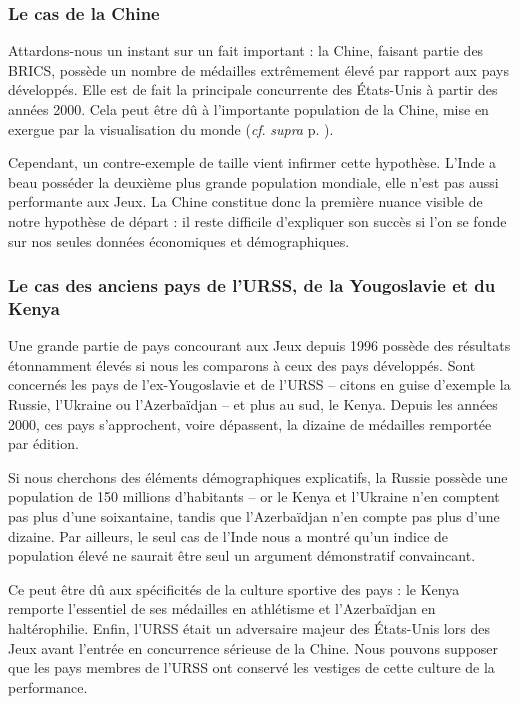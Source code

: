 \documentclass[hidelinks, 12pt]{report}
\begin{document}
\subsubsection{Le cas de la Chine}

Attardons-nous un instant sur un fait important : la Chine, faisant partie des BRICS, possède un nombre de médailles extrêmement élevé par rapport aux pays développés. Elle est de fait la principale concurrente des États-Unis à partir des années 2000. Cela peut être dû à l'importante population de la Chine, mise en exergue par la visualisation du monde (\textit{cf}. \textit{supra} p. \pageref{map}).

Cependant, un contre-exemple de taille vient infirmer cette hypothèse. L'Inde a beau posséder la deuxième plus grande population mondiale, elle n'est pas aussi performante aux Jeux. La Chine constitue donc la première nuance visible de notre hypothèse de départ : il reste difficile d’expliquer son succès si l’on se fonde sur nos seules données économiques et démographiques.

\subsubsection{Le cas des anciens pays de l’URSS, de la Yougoslavie et du Kenya}

Une grande partie de pays concourant aux Jeux depuis 1996 possède des résultats étonnamment élevés si nous les comparons à ceux des pays développés. Sont concernés les pays de l'ex-Yougoslavie et de l'URSS -- citons en guise d'exemple la Russie, l'Ukraine ou l'Azerbaïdjan -- et plus au sud, le Kenya. Depuis les années 2000, ces pays s'approchent, voire dépassent, la dizaine de médailles remportée par édition. 

Si nous cherchons des éléments démographiques explicatifs, la Russie possède une population de 150 millions d'habitants -- or le Kenya et l'Ukraine n'en comptent pas plus d'une soixantaine, tandis que l'Azerbaïdjan n'en compte pas plus d'une dizaine. Par ailleurs, le seul cas de l'Inde nous a montré qu'un indice de population élevé ne saurait être seul un argument démonstratif convaincant.

Ce peut être dû aux spécificités de la culture sportive des pays : le Kenya remporte l'essentiel de ses médailles en athlétisme et l'Azerbaïdjan en haltérophilie. Enfin, l'URSS était un adversaire majeur des États-Unis lors des Jeux avant l'entrée en concurrence sérieuse de la Chine. Nous pouvons supposer que les pays membres de l'URSS ont conservé les vestiges de cette culture de la performance.
\newline
\end{document}
